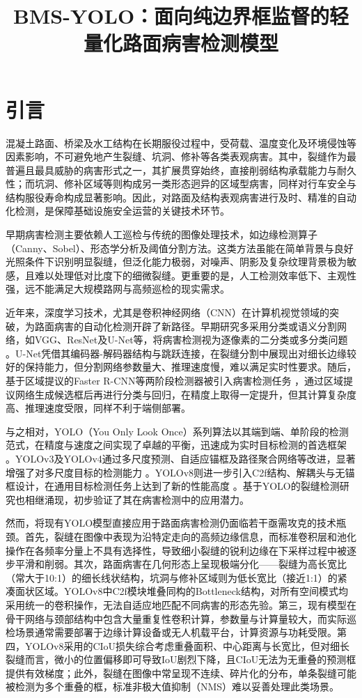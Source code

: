 \documentclass[twocolumn]{sn-jnl}
\title{BMS-YOLO：面向纯边界框监督的轻量化路面病害检测模型}
\author*[1]{\fnm{Qi} \sur{Liu}}
\affil[1]{\orgdiv{Department}, \orgname{University}, \orgaddress{\city{City}, \country{Country}}}
\begin{document}
	
	\maketitle
	\section{引言}
	混凝土路面、桥梁及水工结构在长期服役过程中，受荷载、温度变化及环境侵蚀等因素影响，不可避免地产生裂缝、坑洞、修补等各类表观病害。其中，裂缝作为最普遍且最具威胁的病害形式之一，其扩展贯穿始终，直接削弱结构承载能力与耐久性；而坑洞、修补区域等则构成另一类形态迥异的区域型病害，同样对行车安全与结构服役寿命构成显著影响。因此，对路面及结构表观病害进行及时、精准的自动化检测，是保障基础设施安全运营的关键技术环节。
	
	早期病害检测主要依赖人工巡检与传统的图像处理技术，如边缘检测算子（Canny、Sobel）、形态学分析及阈值分割方法。这类方法虽能在简单背景与良好光照条件下识别明显裂缝，但泛化能力极弱，对噪声、阴影及复杂纹理背景极为敏感，且难以处理低对比度下的细微裂缝。更重要的是，人工检测效率低下、主观性强，远不能满足大规模路网与高频巡检的现实需求。
	
	近年来，深度学习技术，尤其是卷积神经网络（CNN）在计算机视觉领域的突破，为路面病害的自动化检测开辟了新路径。早期研究多采用分类或语义分割网络，如VGG、ResNet及U-Net等，将病害检测视为逐像素的二分类或多分类问题 \cite{Ronneberger2015, He2016}。U-Net凭借其编码器-解码器结构与跳跃连接，在裂缝分割中展现出对细长边缘较好的保持能力，但分割网络参数量大、推理速度慢，难以满足实时性要求。随后，基于区域提议的Faster R-CNN等两阶段检测器被引入病害检测任务 \cite{Ren2016, Tang2019, Li2021}，通过区域提议网络生成候选框后再进行分类与回归，在精度上取得一定提升，但其计算复杂度高、推理速度受限，同样不利于端侧部署。
	
	与之相对，YOLO（You Only Look Once）系列算法以其端到端、单阶段的检测范式，在精度与速度之间实现了卓越的平衡，迅速成为实时目标检测的首选框架 \cite{Redmon2016}。YOLOv3及YOLOv4通过多尺度预测、自适应锚框及路径聚合网络等改进，显著增强了对多尺度目标的检测能力 \cite{Farhadi2018, Bochkovskiy2020}。YOLOv8则进一步引入C2f结构、解耦头与无锚框设计，在通用目标检测任务上达到了新的性能高度 \cite{Jocher2023}。基于YOLO的裂缝检测研究也相继涌现，初步验证了其在病害检测中的应用潜力。
	
	然而，将现有YOLO模型直接应用于路面病害检测仍面临若干亟需攻克的技术瓶颈。首先，裂缝在图像中表现为沿特定走向的高频边缘信息，而标准卷积层和池化操作在各频率分量上不具有选择性，导致细小裂缝的锐利边缘在下采样过程中被逐步平滑和削弱。其次，路面病害在几何形态上呈现极端分化——裂缝为高长宽比（常大于10:1）的细长线状结构，坑洞与修补区域则为低长宽比（接近1:1）的紧凑面状区域。YOLOv8中C2f模块堆叠同构的Bottleneck结构，对所有空间模式均采用统一的卷积操作，无法自适应地匹配不同病害的形态先验。第三，现有模型在骨干网络与颈部结构中包含大量重复性卷积计算，参数量与计算量较大，而实际巡检场景通常需要部署于边缘计算设备或无人机载平台，计算资源与功耗受限。第四，YOLOv8采用的CIoU损失综合考虑重叠面积、中心距离与长宽比，但对细长裂缝而言，微小的位置偏移即可导致IoU剧烈下降，且CIoU无法为无重叠的预测框提供有效梯度；此外，裂缝在图像中常呈现不连续、碎片化的分布，单条裂缝可能被检测为多个重叠的框，标准非极大值抑制（NMS）难以妥善处理此类场景。
\end{document}
